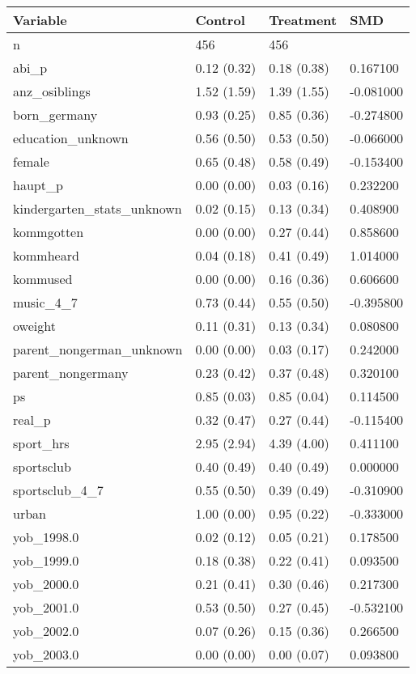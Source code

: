 \begin{tabular}{llll}
\toprule
Variable & Control & Treatment & SMD \\
\midrule
n & 456 & 456 &  \\
abi\_p & 0.12 (0.32) & 0.18 (0.38) & 0.167100 \\
anz\_osiblings & 1.52 (1.59) & 1.39 (1.55) & -0.081000 \\
born\_germany & 0.93 (0.25) & 0.85 (0.36) & -0.274800 \\
education\_unknown & 0.56 (0.50) & 0.53 (0.50) & -0.066000 \\
female & 0.65 (0.48) & 0.58 (0.49) & -0.153400 \\
haupt\_p & 0.00 (0.00) & 0.03 (0.16) & 0.232200 \\
kindergarten\_stats\_unknown & 0.02 (0.15) & 0.13 (0.34) & 0.408900 \\
kommgotten & 0.00 (0.00) & 0.27 (0.44) & 0.858600 \\
kommheard & 0.04 (0.18) & 0.41 (0.49) & 1.014000 \\
kommused & 0.00 (0.00) & 0.16 (0.36) & 0.606600 \\
music\_4\_7 & 0.73 (0.44) & 0.55 (0.50) & -0.395800 \\
oweight & 0.11 (0.31) & 0.13 (0.34) & 0.080800 \\
parent\_nongerman\_unknown & 0.00 (0.00) & 0.03 (0.17) & 0.242000 \\
parent\_nongermany & 0.23 (0.42) & 0.37 (0.48) & 0.320100 \\
ps & 0.85 (0.03) & 0.85 (0.04) & 0.114500 \\
real\_p & 0.32 (0.47) & 0.27 (0.44) & -0.115400 \\
sport\_hrs & 2.95 (2.94) & 4.39 (4.00) & 0.411100 \\
sportsclub & 0.40 (0.49) & 0.40 (0.49) & 0.000000 \\
sportsclub\_4\_7 & 0.55 (0.50) & 0.39 (0.49) & -0.310900 \\
urban & 1.00 (0.00) & 0.95 (0.22) & -0.333000 \\
yob\_1998.0 & 0.02 (0.12) & 0.05 (0.21) & 0.178500 \\
yob\_1999.0 & 0.18 (0.38) & 0.22 (0.41) & 0.093500 \\
yob\_2000.0 & 0.21 (0.41) & 0.30 (0.46) & 0.217300 \\
yob\_2001.0 & 0.53 (0.50) & 0.27 (0.45) & -0.532100 \\
yob\_2002.0 & 0.07 (0.26) & 0.15 (0.36) & 0.266500 \\
yob\_2003.0 & 0.00 (0.00) & 0.00 (0.07) & 0.093800 \\
\bottomrule
\end{tabular}
